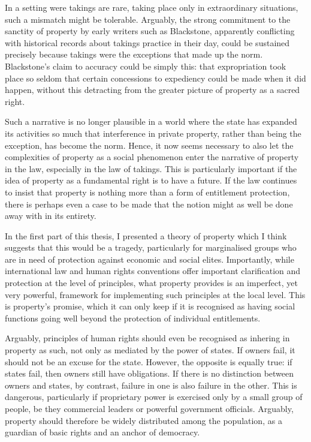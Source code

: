 In a setting were takings are rare, taking place only in extraordinary situations, such a mismatch might be tolerable. Arguably, the strong commitment to the sanctity of property by early writers such as Blackstone, apparently conflicting with historical records about takings practice in their day, could be sustained precisely because takings were the exceptions that made up the norm.  Blackstone's claim to accuracy could be simply this: that expropriation took place so seldom that  certain concessions to expediency could be made when it did happen, without this detracting from the greater picture of property as a sacred right.

Such a narrative is no longer plausible in a world where the state has expanded its activities so much that interference in private property, rather than being the exception, has become the norm. Hence, it now seems necessary to also let the complexities of property as a social phenomenon enter the narrative of property in the law, especially in the law of takings. This is particularly important if the idea of property as a fundamental right is to have a future. If the law continues to insist that property is nothing more than a form of entitlement protection, there is perhaps even a case to be made that the notion might as well be done away with in its entirety.

In the first part of this thesis, I presented a theory of property which I think suggests that this would be a tragedy, particularly for marginalised groups who are in need of protection against economic and social elites. Importantly, while international law and human rights conventions offer important clarification and protection at the level of principles, what property provides is an imperfect, yet very powerful, framework for implementing such principles at the local level. This is property's promise, which it can only keep if it is recognised as having social functions going well beyond the protection of individual entitlements.

Arguably, principles of human rights should even be recognised as inhering in property as such, not only as mediated by the power of states. If owners fail, it should not be an excuse for the state. However, the opposite is equally true: if states fail, then owners still have obligations. If there is no distinction between owners and states, by contrast, failure in one is also failure in the other. This is dangerous, particularly if proprietary power is exercised only by a small group of people, be they commercial leaders or powerful government officials. Arguably, property should therefore be widely distributed among the population, as a guardian of basic rights and an anchor of democracy.
 
